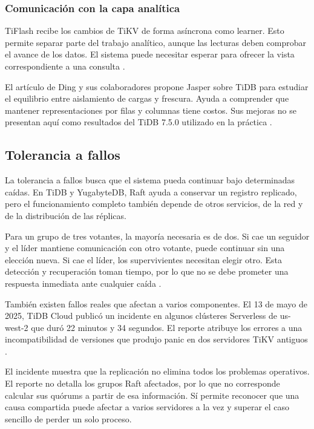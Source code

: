 \documentclass[11pt,a4paper]{article}
\begin{document}
\subsubsection{Comunicación con la capa analítica}
TiFlash recibe los cambios de TiKV de forma asíncrona como learner. Esto permite separar parte del trabajo analítico, aunque las lecturas deben comprobar el avance de los datos. El sistema puede necesitar esperar para ofrecer la vista correspondiente a una consulta \cite{tidb_tiflash}.

El artículo de Ding y sus colaboradores propone Jasper sobre TiDB para estudiar el equilibrio entre aislamiento de cargas y frescura. Ayuda a comprender que mantener representaciones por filas y columnas tiene costos. Sus mejoras no se presentan aquí como resultados del TiDB 7.5.0 utilizado en la práctica \cite{ding2026jasper}.

\subsection{Tolerancia a fallos}
La tolerancia a fallos busca que el sistema pueda continuar bajo determinadas caídas. En TiDB y YugabyteDB, Raft ayuda a conservar un registro replicado, pero el funcionamiento completo también depende de otros servicios, de la red y de la distribución de las réplicas.

Para un grupo de tres votantes, la mayoría necesaria es de dos. Si cae un seguidor y el líder mantiene comunicación con otro votante, puede continuar sin una elección nueva. Si cae el líder, los supervivientes necesitan elegir otro. Esta detección y recuperación toman tiempo, por lo que no se debe prometer una respuesta inmediata ante cualquier caída \cite{tidb_storage,yb_repl}.

También existen fallos reales que afectan a varios componentes. El 13 de mayo de 2025, TiDB Cloud publicó un incidente en algunos clústeres Serverless de us-west-2 que duró 22 minutos y 34 segundos. El reporte atribuye los errores a una incompatibilidad de versiones que produjo panic en dos servidores TiKV antiguos \cite{tidb_incidente}.

El incidente muestra que la replicación no elimina todos los problemas operativos. El reporte no detalla los grupos Raft afectados, por lo que no corresponde calcular sus quórums a partir de esa información. Sí permite reconocer que una causa compartida puede afectar a varios servidores a la vez y superar el caso sencillo de perder un solo proceso.
\end{document}
